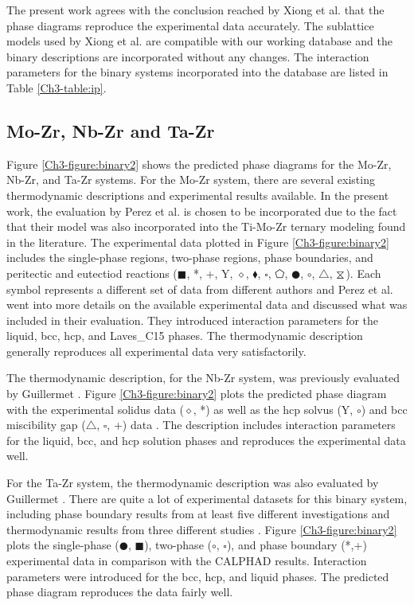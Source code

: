 The present work agrees with the conclusion reached by Xiong et al. \cite{Xiong2004} that the phase diagrams reproduce the experimental data accurately. The sublattice models used by Xiong et al. \cite{Xiong2004} are compatible with our working database and the binary descriptions are incorporated without any changes. The interaction parameters for the binary systems incorporated into the database are listed in Table \ref{Ch3-table:ip}. 

\subsection{Mo-Zr, Nb-Zr and Ta-Zr}

Figure \ref{Ch3-figure:binary2} shows the predicted phase diagrams for the Mo-Zr, Nb-Zr, and Ta-Zr systems. For the Mo-Zr system, there are several existing thermodynamic descriptions and experimental results available. In the present work, the evaluation by Perez et al. \cite{Perez2003} is chosen to be incorporated due to the fact that their model was also incorporated into the Ti-Mo-Zr ternary modeling found in the literature. The experimental data plotted in Figure \ref{Ch3-figure:binary2} includes the single-phase regions, two-phase regions, phase boundaries, and peritectic and eutectiod reactions ($\blacksquare$, *, +, Y, $\diamond$, $\blacklozenge$, $\square$, $\pentagon$, $\CIRCLE$, $\circ$, $\bigtriangleup$, $\hourglasses$ ). Each symbol represents a different set of data from different authors and Perez et al. \cite{Perez2003} went into more details on the available experimental data and discussed what was included in their evaluation. They \cite{Perez2003} introduced interaction parameters for the liquid, bcc, hcp, and Laves\_C15 phases. The thermodynamic description generally reproduces all experimental data very satisfactorily. 

The thermodynamic description, for the Nb-Zr system, was previously evaluated by Guillermet \cite{Guillermet1991}. Figure \ref{Ch3-figure:binary2} plots the predicted phase diagram with the experimental solidus data ($\diamond$, *) as well as the hcp solvus (Y, $\circ$) and bcc miscibility gap ($\bigtriangleup$, $\square$, +) data \cite{Guillermet1991,Kumar1994a,Abriata1982}. The description includes interaction parameters for the liquid, bcc, and hcp solution phases and reproduces the experimental data well. 

For the Ta-Zr system, the thermodynamic description was also evaluated by Guillermet \cite{Guillermet1995}. There are quite a lot of experimental datasets for this binary system, including phase boundary results from at least five different investigations and thermodynamic results from three different studies \cite{Guillermet1995}. Figure \ref{Ch3-figure:binary2} plots the single-phase ($\CIRCLE$, $\blacksquare$), two-phase ($\circ$, $\square$), and phase boundary (*,+) experimental data in comparison with the CALPHAD results. Interaction parameters were introduced for the bcc, hcp, and liquid phases. The predicted phase diagram reproduces the data fairly well. 

